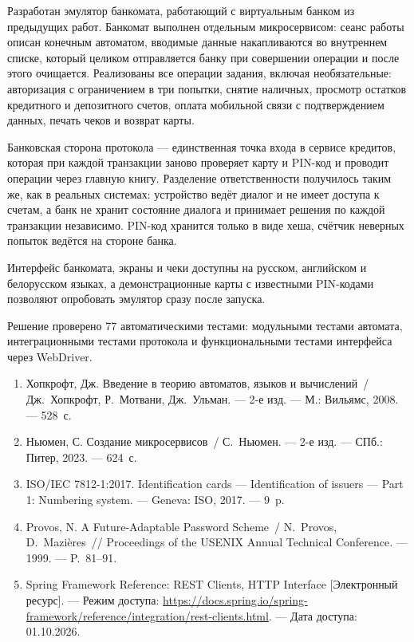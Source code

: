 \documentclass[14pt,a4paper]{extarticle}
\begin{document}


Разработан эмулятор банкомата, работающий с виртуальным банком из предыдущих работ.
Банкомат выполнен отдельным микросервисом: сеанс работы описан конечным автоматом, вводимые
данные накапливаются во внутреннем списке, который целиком отправляется банку при
совершении операции и после этого очищается. Реализованы все операции задания, включая
необязательные: авторизация с ограничением в три попытки, снятие наличных, просмотр остатков
кредитного и депозитного счетов, оплата мобильной связи с подтверждением данных, печать
чеков и возврат карты.

Банковская сторона протокола --- единственная точка входа в сервисе кредитов, которая
при каждой транзакции заново проверяет карту и PIN-код и проводит операции через главную
книгу. Разделение ответственности получилось таким же, как в реальных системах: устройство
ведёт диалог и не имеет доступа к счетам, а банк не хранит состояние диалога и принимает
решения по каждой транзакции независимо. PIN-код хранится только в виде хеша, счётчик
неверных попыток ведётся на стороне банка.

Интерфейс банкомата, экраны и чеки доступны на русском, английском и белорусском языках, а
демонстрационные карты с известными PIN-кодами позволяют опробовать эмулятор сразу после
запуска.

Решение проверено 77 автоматическими тестами: модульными тестами автомата,
интеграционными тестами протокола и функциональными тестами интерфейса через WebDriver.


\begin{enumerate}
\item Хопкрофт, Дж. Введение в теорию автоматов, языков и вычислений~/ Дж.~Хопкрофт,
Р.~Мотвани, Дж.~Ульман. --- 2-е изд. --- М.: Вильямс, 2008. --- 528~с.
\item Ньюмен, С. Создание микросервисов~/ С.~Ньюмен. --- 2-е изд. --- СПб.: Питер, 2023. ---
624~с.
\item ISO/IEC 7812-1:2017. Identification cards --- Identification of issuers --- Part 1:
Numbering system. --- Geneva: ISO, 2017. --- 9~p.
\item Provos, N. A Future-Adaptable Password Scheme~/ N.~Provos, D.~Mazi\`eres~// Proceedings
of the USENIX Annual Technical Conference. --- 1999. --- P.~81--91.
\item Spring Framework Reference: REST Clients, HTTP Interface [Электронный ресурс]. ---
Режим доступа: \url{https://docs.spring.io/spring-framework/reference/integration/rest-clients.html}.
--- Дата доступа: 01.10.2026.
\end{enumerate}



\end{document}
